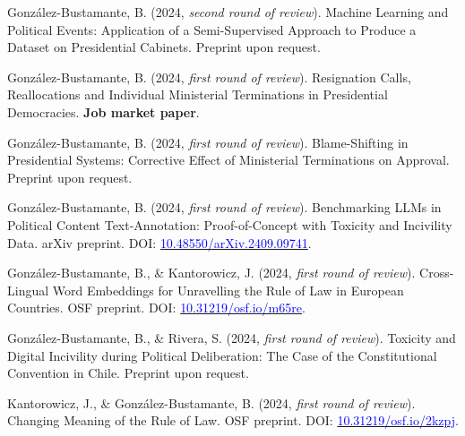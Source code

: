 \begin{publications}

\begin{benumerate}{9}

\item{González-Bustamante, B. (2024, {\itshape second round of review}). Machine Learning and Political Events: Application of a Semi-Supervised Approach to Produce a Dataset on Presidential Cabinets. Preprint upon request.}\vspace{1mm}

\item{González-Bustamante, B. (2024, {\itshape first round of review}). Resignation Calls, Reallocations and Individual Ministerial Terminations in Presidential Democracies. {\bfseries Job market paper}.}\vspace{1mm}

\item{González-Bustamante, B. (2024, {\itshape first round of review}). Blame-Shifting in Presidential Systems: Corrective Effect of Ministerial Terminations on Approval. Preprint upon request.}\vspace{1mm}

\item{González-Bustamante, B. (2024, {\itshape first round of review}). Benchmarking LLMs in Political Content Text-Annotation: Proof-of-Concept with Toxicity and Incivility Data. arXiv preprint. DOI: \href{https://doi.org/10.48550/arXiv.2409.09741}{\textcolor{blue}{10.48550/arXiv.2409.09741}}.}\vspace{1mm}

\item{González-Bustamante, B., \& Kantorowicz, J. (2024, {\itshape first round of review}). Cross-Lingual Word Embeddings for Unravelling the Rule of Law in European Countries. OSF preprint. DOI: \href{https://doi.org/10.31219/osf.io/m65re}{\textcolor{blue}{10.31219/osf.io/m65re}}.}\vspace{1mm}

\item{González-Bustamante, B., \& Rivera, S. (2024, {\itshape first round of review}). Toxicity and Digital Incivility during Political Deliberation: The Case of the Constitutional Convention in Chile. Preprint upon request.}\vspace{1mm}

\item{Kantorowicz, J., \& González-Bustamante, B. (2024, {\itshape first round of review}). Changing Meaning of the Rule of Law. OSF preprint. DOI: \href{https://doi.org/10.31219/osf.io/2kzpj}{\textcolor{blue}{10.31219/osf.io/2kzpj}}.}\vspace{1mm}


\end{benumerate}
\end{publications}

